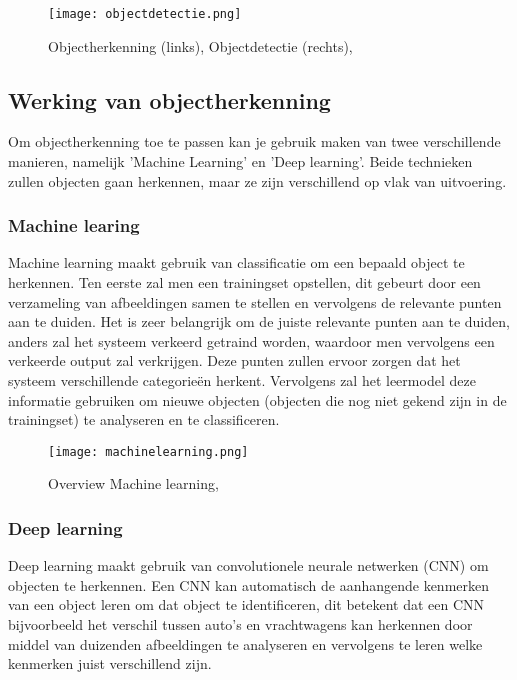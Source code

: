 \begin{figure}[H]
	\centering
	\texttt{[image: objectdetectie.png]}
	\caption{Objectherkenning (links), Objectdetectie (rechts), \autocite{ObjRec2020}}
\end{figure}

\subsection{Werking van objectherkenning}
Om objectherkenning toe te passen kan je gebruik maken van twee verschillende manieren, namelijk 'Machine Learning' en 'Deep learning'. Beide technieken zullen objecten gaan herkennen, maar ze zijn verschillend op vlak van uitvoering.

\subsubsection{Machine learing}
Machine learning maakt gebruik van classificatie om een bepaald object te herkennen. Ten eerste zal men een trainingset opstellen, dit gebeurt door een verzameling van afbeeldingen samen te stellen en vervolgens de relevante punten aan te duiden. Het is zeer belangrijk om de juiste relevante punten aan te duiden, anders zal het systeem verkeerd getraind worden, waardoor men vervolgens een verkeerde output zal verkrijgen. Deze punten zullen ervoor zorgen dat het systeem verschillende categorieën herkent. Vervolgens zal het leermodel deze informatie gebruiken om nieuwe objecten (objecten die nog niet gekend zijn in de trainingset) te analyseren en te classificeren. \autocite{ObjRec2020}


\begin{figure}[H]
	\centering
	\texttt{[image: machinelearning.png]}
	\caption{Overview Machine learning, \autocite{ObjRec2020}}
\end{figure}


\subsubsection{Deep learning}
Deep learning maakt gebruik van convolutionele neurale netwerken (CNN) om objecten te herkennen. Een CNN kan automatisch de aanhangende kenmerken van een object leren om dat object te identificeren, dit betekent dat een CNN bijvoorbeeld het verschil tussen auto's en vrachtwagens kan herkennen door middel van duizenden afbeeldingen te analyseren en vervolgens te leren welke kenmerken juist verschillend zijn. \autocite{ObjRec2020}

